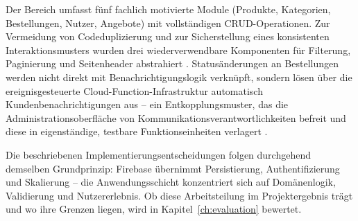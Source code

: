 Der Bereich umfasst fünf fachlich motivierte Module (Produkte, Kategorien, Bestellungen, Nutzer, Angebote) mit vollständigen CRUD-Operationen. Zur Vermeidung von Codeduplizierung und zur Sicherstellung eines konsistenten Interaktionsmusters wurden drei wiederverwendbare Komponenten für Filterung, Paginierung und Seitenheader abstrahiert \cite{kothapalli2021}. Statusänderungen an Bestellungen werden nicht direkt mit Benachrichtigungslogik verknüpft, sondern lösen über die ereignisgesteuerte Cloud-Function-Infrastruktur automatisch Kundenbenachrichtigungen aus -- ein Entkopplungsmuster, das die Administrationsoberfläche von Kommunikationsverantwortlichkeiten befreit und diese in eigenständige, testbare Funktionseinheiten verlagert \cite{milojkovic2024}.

Die beschriebenen Implementierungsentscheidungen folgen durchgehend demselben Grundprinzip: Firebase übernimmt Persistierung, Authentifizierung und Skalierung -- die Anwendungsschicht konzentriert sich auf Domänenlogik, Validierung und Nutzererlebnis. Ob diese Arbeitsteilung im Projektergebnis trägt und wo ihre Grenzen liegen, wird in Kapitel~\ref{ch:evaluation} bewertet.
